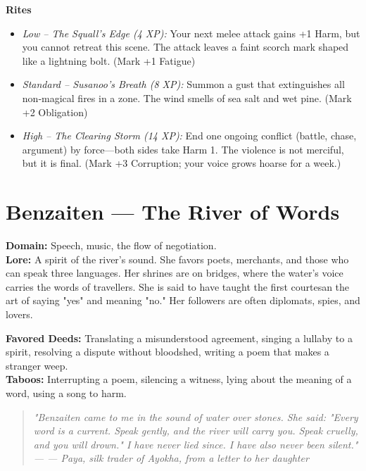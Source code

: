 \documentclass[12pt]{book}
\newcommand{\letter}[2]{%
    \begin{quote}\small\itshape #1 \hfill --- #2\end{quote}}
\begin{document}
\begin{infobox}
\textbf{Rites}
\begin{itemize}
    \item \textit{Low -- The Squall's Edge (4 XP):} Your next melee attack gains +1 Harm, but you cannot retreat this scene. The attack leaves a faint scorch mark shaped like a lightning bolt. (Mark +1 Fatigue)
    \item \textit{Standard -- Susanoo's Breath (8 XP):} Summon a gust that extinguishes all non‑magical fires in a zone. The wind smells of sea salt and wet pine. (Mark +2 Obligation)
    \item \textit{High -- The Clearing Storm (14 XP):} End one ongoing conflict (battle, chase, argument) by force---both sides take Harm 1. The violence is not merciful, but it is final. (Mark +3 Corruption; your voice grows hoarse for a week.)
\end{itemize}
\end{infobox}

\section{Benzaiten --- The River of Words}
\noindent\textbf{Domain:} Speech, music, the flow of negotiation.\\
\textbf{Lore:} A spirit of the river's sound. She favors poets, merchants, and those who can speak three languages. Her shrines are on bridges, where the water's voice carries the words of travellers. She is said to have taught the first courtesan the art of saying "yes" and meaning "no." Her followers are often diplomats, spies, and lovers.

\textbf{Favored Deeds:} Translating a misunderstood agreement, singing a lullaby to a spirit, resolving a dispute without bloodshed, writing a poem that makes a stranger weep.\\
\textbf{Taboos:} Interrupting a poem, silencing a witness, lying about the meaning of a word, using a song to harm.

\letter{"Benzaiten came to me in the sound of water over stones. She said: "Every word is a current. Speak gently, and the river will carry you. Speak cruelly, and you will drown." I have never lied since. I have also never been silent."}{--- Paya, silk trader of Ayokha, from a letter to her daughter}
\end{document}
